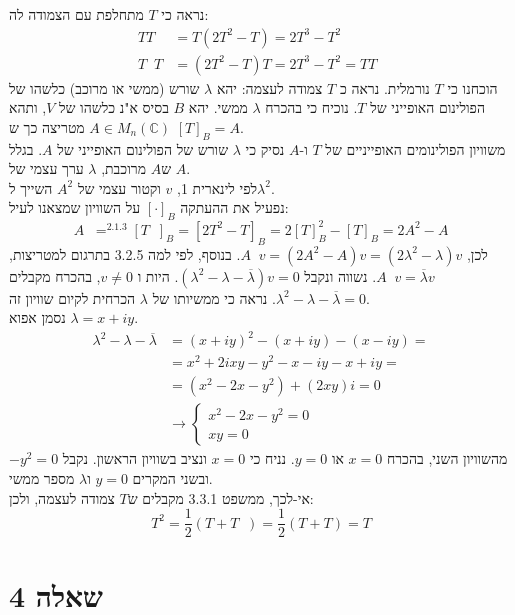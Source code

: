 \documentclass{article}
\def\complex{\mathbb{C}}
\DeclareMathOperator*{\equals}{=}
\DeclareMathOperator{\adj}{^\ast}
\begin{document}
נראה כי $T$ מתחלפת עם הצמודה לה:
\begin{align*}
    TT\adj   & = T(2T^2-T)=2T^3-T^2          \\
    T \adj T & = (2T^2-T)T=2T^3-T^2 = TT\adj
\end{align*}
הוכחנו כי $T$ נורמלית. נראה כ $T$ צמודה לעצמה:
יהא $\lambda$ שורש (ממשי או מרוכב) כלשהו של הפולינום האופייני של $T$. נוכיח כי בהכרח $\lambda$ ממשי.
יהא $B$ בסיס א"נ כלשהו של $V$, ותהא $A\in M_n(\complex)$ מטריצה כך ש $[T]_B=A$. \\
משוויון הפולינומים האופייניים של $T$ ו-$A$ נסיק כי $\lambda$ שורש של הפולינום האופייני של $A$. בגלל ש$A$ מרוכבת, $\lambda$ ערך עצמי של $A$. \\
לפי לינארית 1, $v$ וקטור עצמי של $A^2$ השייך ל$\lambda^2$. \\
נפעיל את ההעתקה $[\cdot]_B$ על השוויון שמצאנו לעיל:
\[
    A \adj \equals^{2.1.3} [T \adj]_B = [2T^2-T]_B = 2[T]_B^2-[T]_B = 2A^2-A
\]
לכן, $A \adj v = (2A^2-A)v=(2\lambda^2-\lambda)v$.
בנוסף, לפי למה 3.2.5 בתרגום למטריצות, $A \adj v = \overline{\lambda}v$. נשווה ונקבל $(\lambda^2-\lambda-\overline{\lambda})v=0$. היות ו $v\ne 0$, בהכרח מקבלים $\lambda^2-\lambda-\overline{\lambda}=0$. נראה כי ממשיותו של $\lambda$ הכרחית לקיום שוויון זה.\\
נסמן אפוא $\lambda=x+iy$.
\begin{align*}
    \lambda^2-\lambda-\overline{\lambda} & =(x+iy)^2-(x+iy)-(x-iy) =            \\
                                         & = x^2 + 2ixy - y^2 -x - iy -x + iy = \\
                                         & = (x^2-2x-y^2)+(2xy)i = 0            \\
                                         & \rightarrow \begin{cases}
                                                           x^2-2x-y^2=0 \\
                                                           xy = 0
                                                       \end{cases}
\end{align*}
מהשוויון השני, בהכרח $x=0$ או $y=0$. נניח כי $x=0$ ונציב בשוויון הראשון. נקבל $-y^2=0$ ובשני המקרים $y=0$ ו$\lambda$ מספר ממשי. \\
אי-לכך, ממשפט 3.3.1 מקבלים ש$T$ צמודה לעצמה, ולכן:
\[
    T^2=\frac{1}{2}(T+T\adj) = \frac{1}{2}(T+T) = T
\]

\pagebreak

\section*{שאלה 4}
\end{document}
